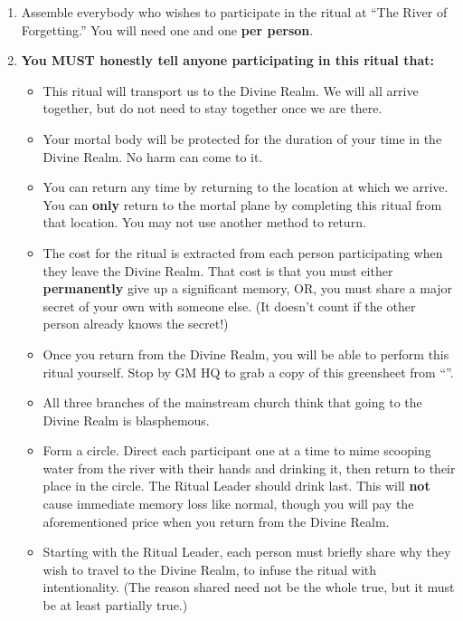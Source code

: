 \documentclass[green]{GL2020}
\begin{document}
\begin{enumerate}
    \item Assemble everybody who wishes to participate in the ritual at ``The River of Forgetting.'' You will need one \iGlassVial{} and one \iRitualCandle{} \textbf{per person}.
    \item \textbf{You MUST honestly tell anyone participating in this ritual that:}
    \begin{itemize}
        \item This ritual will transport us to the Divine Realm. We will all arrive together, but do not need to stay together once we are there.
        \item Your mortal body will be protected for the duration of your time in the Divine Realm. No harm can come to it.
        \item You can return any time by returning to the location at which we arrive. You can \textbf{only} return to the mortal plane by completing this ritual from that location. You may not use another method to return.
        \item The cost for the ritual is extracted from each person participating when they leave the Divine Realm. That cost is that you must either \textbf{permanently} give up a significant memory, OR, you must share a major secret of your own with someone else. (It doesn't count if the other person already knows the secret!)
        \item Once you return from the Divine Realm, you will be able to perform this ritual yourself. Stop by GM HQ to grab a copy of this greensheet from ``\sSignG{}''.
        \item All three branches of the mainstream church think that going to the Divine Realm is blasphemous.
    \end{itemize}
    \begin{itemize}
        \item Form a circle. Direct each participant one at a time to mime scooping water from the river with their hands and drinking it, then return to their place in the circle. The Ritual Leader should drink last. This will \textbf{not} cause immediate memory loss like normal, though you will pay the aforementioned price when you return from the Divine Realm.
        \item Starting with the Ritual Leader, each person must briefly share why they wish to travel to the Divine Realm, to infuse the ritual with intentionality. (The reason shared need not be the whole true, but it must be at least partially true.)

\end{itemize}
\end{enumerate}
\end{document}
